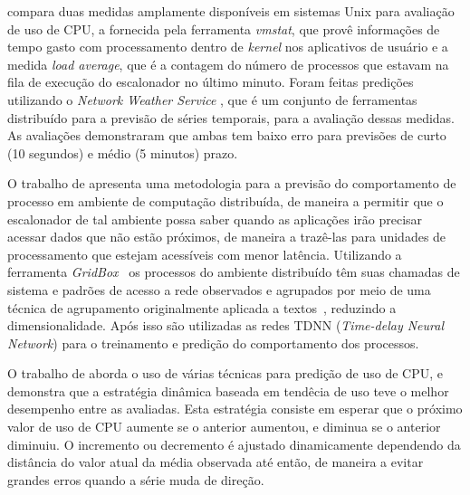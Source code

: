  compara duas medidas amplamente disponíveis
em sistemas Unix para avaliação de uso de CPU, a fornecida pela ferramenta
\emph{vmstat}, que provê informações de tempo gasto com processamento
dentro de \emph{kernel} nos aplicativos de usuário e a medida \emph{load
average}, que é a contagem do número de processos que estavam na fila de
execução do escalonador no último minuto. Foram feitas predições utilizando
o \emph{Network Weather Service} \cite{wolski1999network}, que é um
conjunto de ferramentas distribuído para a previsão de séries temporais,
para a avaliação dessas medidas. As avaliações demonstraram que ambas tem
baixo erro para previsões de curto (10 segundos) e médio (5 minutos) prazo.

O trabalho de  apresenta uma metodologia para a
previsão do comportamento de processo em ambiente de computação distribuída, de
maneira a permitir que o escalonador de tal ambiente possa saber quando as
aplicações irão precisar acessar dados que não estão próximos, de maneira a
trazê-las para unidades de processamento que estejam acessíveis com menor
latência. Utilizando a ferramenta \emph{GridBox}~\cite{dodonov2004gridbox} os
processos do ambiente distribuído têm suas chamadas de sistema e padrões de
acesso a rede observados e agrupados por meio de uma técnica de agrupamento
originalmente aplicada a textos~\cite{de2005automatic}, reduzindo a
dimensionalidade. Após isso são utilizadas as redes TDNN (\emph{Time-delay
Neural Network}) para o treinamento e predição do comportamento dos processos.

O trabalho de  aborda o uso de várias técnicas
para predição de uso de CPU, e demonstra que a estratégia dinâmica baseada em
tendêcia de uso teve o melhor desempenho entre as avaliadas. Esta estratégia
consiste em esperar que o próximo valor de uso de CPU aumente se o anterior
aumentou, e diminua se o anterior diminuiu. O incremento ou decremento é
ajustado dinamicamente dependendo da distância do valor atual da média observada
até então, de maneira a evitar grandes erros quando a série muda de direção.


